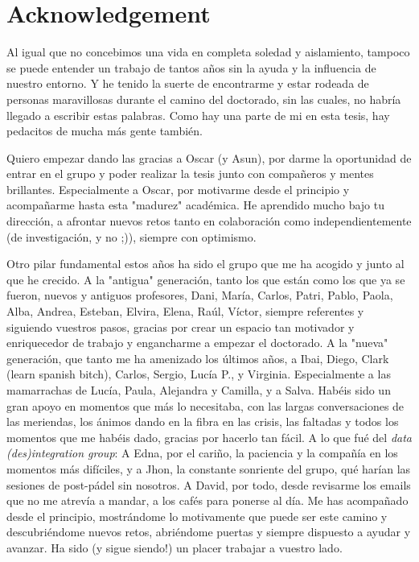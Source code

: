%
\section*{Acknowledgement}
\label{sec::acknowledgement}


Al igual que no concebimos una vida en completa soledad y aislamiento, tampoco se puede entender un trabajo de tantos años sin la ayuda y la influencia de nuestro entorno. Y he tenido la suerte de encontrarme y estar rodeada de personas maravillosas durante el camino del doctorado, sin las cuales, no habría llegado a escribir estas palabras. Como hay una parte de mi en esta tesis, hay pedacitos de mucha más gente también.

Quiero empezar dando las gracias a Oscar (y Asun), por darme la oportunidad de entrar en el grupo y poder realizar la tesis junto con compañeros y mentes brillantes. Especialmente a Oscar, por motivarme desde el principio y acompañarme hasta esta "madurez" académica. He aprendido mucho bajo tu dirección, a afrontar nuevos retos tanto en colaboración como independientemente (de investigación, y no ;)), siempre con optimismo.  

Otro pilar fundamental estos años ha sido el grupo que me ha acogido y junto al que he crecido. A la "antigua" generación, tanto los que están como los que ya se fueron, nuevos y antiguos profesores, Dani, María, Carlos, Patri, Pablo, Paola, Alba, Andrea, Esteban, Elvira, Elena, Raúl, Víctor, siempre referentes y siguiendo vuestros pasos, gracias por crear un espacio tan motivador y enriquecedor de trabajo y engancharme a empezar el doctorado. 
A la "nueva" generación, que tanto me ha amenizado los últimos años, a Ibai, Diego, Clark (learn spanish bitch), Carlos, Sergio, Lucía P., y Virginia. Especialmente a las mamarrachas de Lucía, Paula, Alejandra y Camilla, y a Salva. Habéis sido un gran apoyo en momentos que más lo necesitaba, con las largas conversaciones de las meriendas, los ánimos dando en la fibra en las crisis, las faltadas y todos los momentos que me habéis dado, gracias por hacerlo tan fácil.
A lo que fué del \textit{data (des)integration group}: 
A Edna, por el cariño, la paciencia y la compañía en los momentos más difíciles, y a Jhon, la constante sonriente del grupo, qué harían las sesiones de post-pádel sin nosotros.
A David, por todo, desde revisarme los emails que no me atrevía a mandar, a los cafés para ponerse al día. Me has acompañado desde el principio, mostrándome lo motivamente que puede ser este camino y descubriéndome nuevos retos, abriéndome puertas y siempre dispuesto a ayudar y avanzar. Ha sido (y sigue siendo!) un placer trabajar a vuestro lado.

